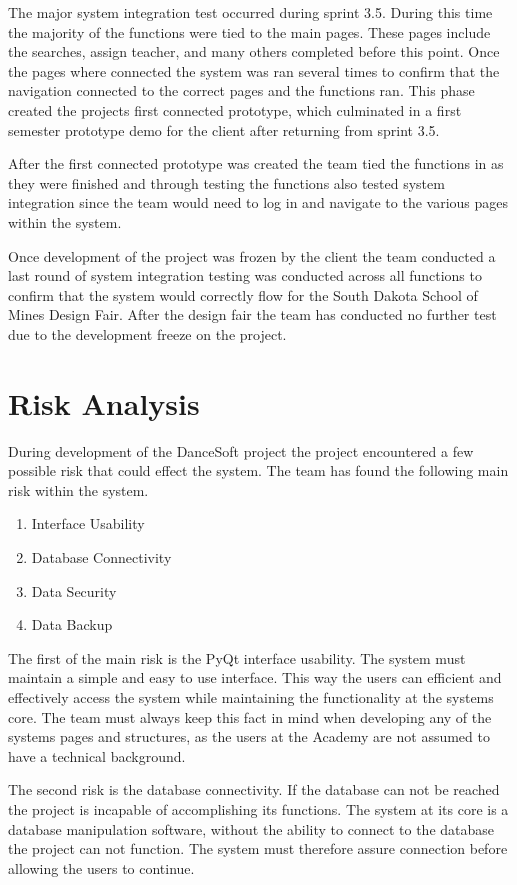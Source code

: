 The major system integration test occurred during sprint 3.5. During this time the majority of the functions were tied to the main pages. These pages include the searches, assign teacher, and many others completed before this point. Once the pages where connected the system was ran several times to confirm that the navigation connected to the correct pages and the functions ran. This phase created the projects first connected prototype, which culminated in a first semester prototype demo for the client after returning from sprint 3.5.

After the first connected prototype was created the team tied the functions in as they were finished and through testing the functions also tested system integration since the team would need to log in and navigate to the various pages within the system. 

Once development of the project was frozen by the client the team conducted a last round of system integration testing was conducted across all functions to confirm that the system would correctly flow for the South Dakota School of Mines Design Fair. After the design fair the team has conducted no further test due to the development freeze on the project.


\section{Risk Analysis}
During development of the DanceSoft project the project encountered a few possible risk that could effect the system. The team has found the following main risk within the system.

\begin{enumerate}
\item Interface Usability
\item Database Connectivity
\item Data Security
\item Data Backup
\end{enumerate}

The first of the main risk is the PyQt interface usability. The system must maintain a simple and easy to use interface. This way the users can efficient and effectively access the system while maintaining the functionality at the systems core. The team must always keep this fact in mind when developing any of the systems pages and structures, as the users at the Academy are not assumed to have a technical background.

The second risk is the database connectivity. If the database can not be reached the project is incapable of accomplishing its functions. The system at its core is a database manipulation software, without the ability to connect to the database the project can not function. The system must therefore assure connection before allowing the users to continue.

